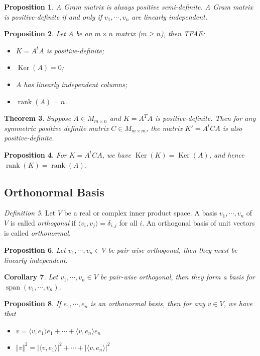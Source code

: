 \documentclass[12pt]{amsart}
\DeclareMathOperator{\rank}{rank}
\renewcommand{\geq}{\geqslant}
\DeclareMathOperator{\Ker}{Ker}
\DeclareMathOperator{\s}{span}
\newtheorem{theorem}{Theorem}[section]
\newtheorem{proposition}[theorem]{Proposition}
\newtheorem{corollary}[theorem]{Corollary}
\theoremstyle{remark}
\newtheorem{definition}[theorem]{Definition}
\numberwithin{equation}{section}
\begin{document}
	\begin{proposition}
		A Gram matrix is always positive semi-definite. A Gram matrix is positive-definite if and only if $v_1,\cdots,v_n$ are linearly independent.
	\end{proposition}
	\begin{proposition}
		Let $A$ be an $m\times n$ matrix ($m\geq n$), then TFAE:
	\begin{itemize}
		\item $K=A^tA$ is positive-definite;
		\item $\Ker(A)=0$;
		\item $A$ has linearly independent columns;
		\item $\rank(A)=n$.
	\end{itemize}
	\end{proposition}
	\begin{theorem}
		Suppose $A\in M_{m\times n}$ and $K=A^TA$ is positive-definite. Then for any symmetric positive definite matrix $C\in M_{m\times m}$, the matrix $K'=A^tCA$ is also positive-definite.
	\end{theorem}
	\begin{proposition}
		For $K=A^tCA$, we have $\Ker (K)=\Ker(A)$, and hence $\rank(K)=\rank(A)$.
	\end{proposition}
	
	\subsection{Orthonormal Basis}
	\begin{definition}Let $V$ be a real or complex inner product space.
		A basis $v_1,\cdots,v_n$ of $V$ is called \emph{orthogonal} if $\langle v_i,v_j\rangle =\delta_{i,j}$ for all $i$. An orthogonal basis of unit vectors is called \emph{orthonormal}.
	\end{definition}
	\begin{proposition}
		Let $v_1,\cdots,v_n\in V$ be pair-wise orthogonal, then they must be linearly independent. 
	\end{proposition}
	\begin{corollary}
		Let $v_1,\cdots,v_n\in V$ be pair-wise orthogonal, then they form a basis for $\s(v_1,\cdots,v_n)$.
	\end{corollary}
	\begin{proposition}
		If $e_1,\cdots,e_n$ is an orthonormal basis, then for any $v\in V$, we have that
		\begin{itemize}
			\item $v=\langle v,e_1\rangle e_1+\cdots+\langle v,e_n\rangle e_n$
			\item $\Vert v\Vert^2= |\langle v,e_1\rangle|^2+\cdots+|\langle v,e_n\rangle |^2$
		\end{itemize}
	\end{proposition}
	
\end{document}
